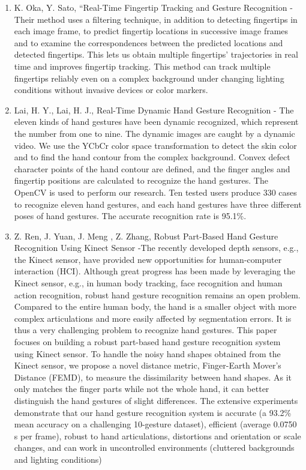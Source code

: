 \documentclass[11pt]{report}
\begin{document}
\begin{enumerate}
    \item K. Oka, Y. Sato, “Real-Time Fingertip Tracking and Gesture Recognition - Their method uses a filtering technique, in addition to detecting fingertips  in  each  image  frame,  to predict fingertip locations in successive image frames and to examine the correspondences between the predicted locations and detected fingertips. This lets us obtain multiple fingertips’ trajectories in real time and improves fingertip tracking. This method can track multiple fingertips reliably even on a complex background under changing lighting conditions without invasive devices or color markers.
    
    \item Lai, H. Y., Lai, H. J., Real-Time Dynamic Hand Gesture Recognition - The  eleven  kinds  of  hand  gestures have  been  dynamic  recognized,  which  represent  the  number from  one  to  nine.  The  dynamic  images  are  caught  by  a  dynamic video.  We  use  the  YCbCr  color  space  transformation  to  detect the  skin  color  and  to  find  the  hand  contour from  the  complex background. Convex defect character points of the hand contour are  defined,  and  the  finger  angles  and  fingertip  positions  are calculated to recognize the hand gestures. The OpenCV is used to perform our research. Ten tested users produce 330 cases to recognize  eleven  hand  gestures,  and  each  hand  gestures  have  three different poses of hand gestures.  The accurate recognition rate is 95.1\%.

    \item Z. Ren, J. Yuan, J. Meng , Z. Zhang, Robust Part-Based Hand Gesture Recognition Using Kinect Sensor -The recently developed depth sensors, e.g., the Kinect sensor, have provided new opportunities for human-computer interaction (HCI). Although great progress has been made by leveraging the Kinect sensor, e.g., in human body tracking, face recognition and human action recognition, robust hand gesture recognition remains an open problem. Compared to the entire human body, the hand is a smaller object with more complex articulations and more easily affected by segmentation errors. It is thus a very challenging problem to recognize hand gestures. This paper focuses on building a robust part-based hand gesture recognition system using Kinect sensor. To handle the noisy hand shapes obtained from the Kinect sensor, we propose a novel distance metric, Finger-Earth Mover's Distance (FEMD), to measure the dissimilarity between hand shapes. As it only matches the finger parts while not the whole hand, it can better distinguish the hand gestures of slight differences. The extensive experiments demonstrate that our hand gesture recognition system is accurate (a 93.2\% mean accuracy on a challenging 10-gesture dataset), efficient (average 0.0750 s per frame), robust to hand articulations, distortions and orientation or scale changes, and can work in uncontrolled environments (cluttered backgrounds and lighting conditions) 
    

\end{enumerate}
\end{document}
